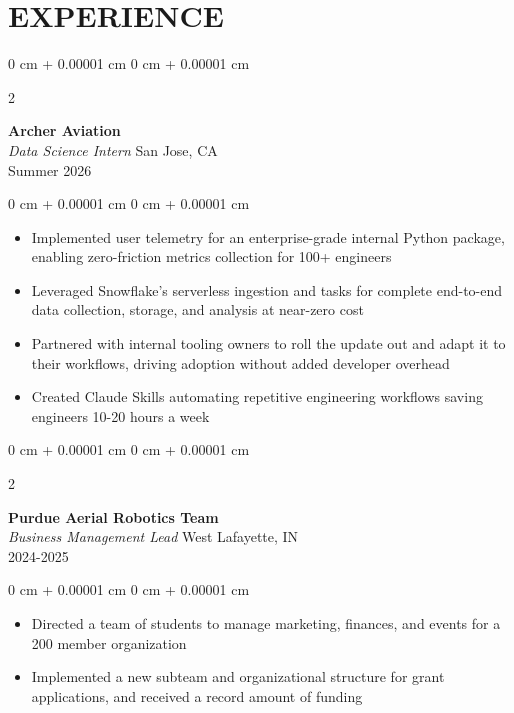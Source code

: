 \documentclass[10pt, letterpaper]{article}
\newenvironment{highlights}{
    \begin{itemize}[
        topsep=0.10 cm,
        parsep=0.10 cm,
        partopsep=0pt,
        itemsep=0pt,
        leftmargin=0 cm + 10pt
    ]
}{
    \end{itemize}
} %
\newenvironment{onecolentry}{
    \begin{adjustwidth}{
        0 cm + 0.00001 cm
    }{
        0 cm + 0.00001 cm
    }
}{
    \end{adjustwidth}
} %
\newenvironment{twocolentry}[2][]{
    \onecolentry
    \def\secondColumn{#2}
    \setcolumnwidth{\fill, 4.5 cm}
    \begin{paracol}{2}
}{
    \switchcolumn \raggedleft \secondColumn
    \end{paracol}
    \endonecolentry
} %
\begin{document}
    
    \section{EXPERIENCE}

        \begin{twocolentry}{
            San Jose, CA
            \\Summer 2026
        }
            \textbf{Archer Aviation}
            \\\textit{Data Science Intern}\end{twocolentry}

        \vspace{0.10 cm}
        \begin{onecolentry}
            \begin{highlights}
                \item Implemented user telemetry for an enterprise-grade internal Python package, enabling zero-friction metrics collection for 100+ engineers
                \item Leveraged Snowflake's serverless ingestion and tasks for complete end-to-end data collection, storage, and analysis at near-zero cost
                \item Partnered with internal tooling owners to roll the update out and adapt it to their workflows, driving adoption without added developer overhead
                \item Created Claude Skills automating repetitive engineering workflows saving engineers 10-20 hours a week
            \end{highlights}
        \end{onecolentry}


        \vspace{0.2 cm}

        \begin{twocolentry}{
            West Lafayette, IN
            \\2024-2025
        }
            \textbf{Purdue Aerial Robotics Team}
            \\\textit{Business Management Lead}\end{twocolentry}

        \vspace{0.10 cm}
        \begin{onecolentry}
            \begin{highlights}
                \item Directed a team of students to manage marketing, finances, and events for a 200 member organization
                \item Implemented a new subteam and organizational structure for grant applications, and received a record amount of funding
            \end{highlights}
        \end{onecolentry}
\end{document}
